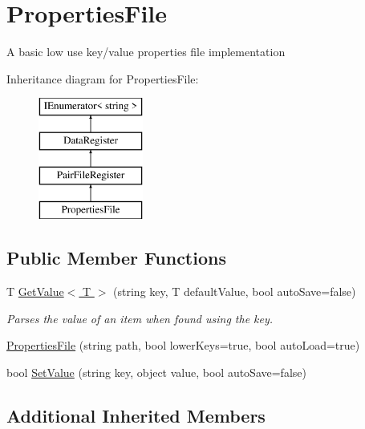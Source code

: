 \hypertarget{classOTA_1_1Misc_1_1PropertiesFile}{}\section{Properties\+File}
\label{classOTA_1_1Misc_1_1PropertiesFile}


A basic low use key/value properties file implementation  


Inheritance diagram for Properties\+File\+:\begin{figure}[H]
\begin{center}
\leavevmode
\includegraphics[height=4.000000cm]{classOTA_1_1Misc_1_1PropertiesFile}
\end{center}
\end{figure}
\subsection*{Public Member Functions}
\begin{DoxyCompactItemize}
\item 
T \hyperlink{classOTA_1_1Misc_1_1PropertiesFile_a147b61402aae9b15d05f9896e61251aa}{Get\+Value$<$ T $>$} (string key, T default\+Value, bool auto\+Save=false)
\begin{DoxyCompactList}\small\item\em Parses the value of an item when found using the key. \end{DoxyCompactList}\item 
\hyperlink{classOTA_1_1Misc_1_1PropertiesFile_a2bc36d5dd4c5c00f1ac4f9b9a467fb3b}{Properties\+File} (string path, bool lower\+Keys=true, bool auto\+Load=true)
\item 
bool \hyperlink{classOTA_1_1Misc_1_1PropertiesFile_adb5c4b77d5aec39fe2e9cf8b5be91918}{Set\+Value} (string key, object value, bool auto\+Save=false)
\end{DoxyCompactItemize}
\subsection*{Additional Inherited Members}


